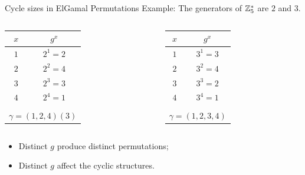 \begin{frame}{Cycle sizes in ElGamal Permutations}
Example: The generators of $\mathbb{Z}_5^*$ are  $2$ and $3$.

    \begin{columns}
        \begin{column}{0.45\textwidth}
        \centering
    	    \begin{tabular}{c|c}
    	        $x$ & $g^{x} $ \\ \hline \hline
    	        $1$ & $2^{1} = 2$ \\
    	        $2$ & $2^{2} = 4$ \\
    	        $3$ & $2^{3} = 3$ \\
              $4$ & $2^{4} = 1$  \\
                \multicolumn{2}{c}{} \\
              \multicolumn{2}{c}{$\gamma = (1,2,4)(3)$}
    	    \end{tabular}
        \end{column}
        \begin{column}{0.45\textwidth}
    	    \centering
    	    \begin{tabular}{c|c}
    	        $x$ & $g^{x} $ \\ \hline \hline
    	        $1$ & $3^{1} = 3$ \\
    	        $2$ & $3^{2} = 4$ \\
    	        $3$ & $3^{3} = 2$ \\
    	        $4$ & $3^{4} = 1$  \\
                \multicolumn{2}{c}{} \\
              \multicolumn{2}{c}{$\gamma  = (1,2,3,4)$}
    	    \end{tabular}
        \end{column}
  \end{columns}
  \vspace{1cm}
  
  \pause
  \begin{itemize}
      \item Distinct $g$ produce distinct permutations;
      \item Distinct $g$ affect the cyclic structures.
  \end{itemize}
  
\end{frame}

